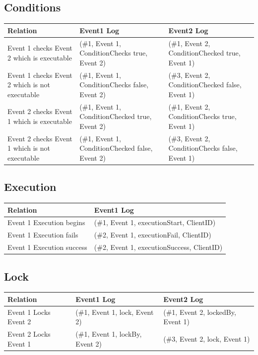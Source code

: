 \subsection{Conditions}
\begin{tabularx}{\textwidth}{|*{3}{>{\raggedright\arraybackslash}X|}}\hline
	Relation & Event1 Log & Event2 Log \\\hline
	Event 1 checks Event 2 which is executable & (\#1, Event 1, ConditionChecks true, Event 2) & (\#1, Event 2, ConditionChecked true, Event 1) \\\hline
	Event 1 checks Event 2 which is not executable & (\#1, Event 1, ConditionChecks false, Event 2) & (\#3, Event 2, ConditionChecked false, Event 1) \\\hline
	Event 2 checks Event 1 which is executable & (\#1, Event 1, ConditionChecked true, Event 2) & (\#1, Event 2, ConditionChecks true, Event 1) \\\hline
	Event 2 checks Event 1 which is not executable & (\#1, Event 1, ConditionChecked false, Event 2) & (\#3, Event 2, ConditionChecks false, Event 1) \\\hline
\end{tabularx}

\subsection{Execution}
\begin{tabularx}{\textwidth}{ | X | X | }
  \hline
  Relation & Event1 Log \\
  \hline
  Event 1 Execution begins & (\#1, Event 1, executionStart, ClientID) \\
  \hline
  Event 1 Execution fails & (\#2, Event 1, executionFail, ClientID) \\
  \hline
  Event 1 Execution success & (\#2, Event 1, executionSuccess, ClientID) \\
  \hline
\end{tabularx}

\subsection{Lock}
\begin{tabularx}{\textwidth}{|*{3}{>{\raggedright\arraybackslash}X|}}
  \hline
  Relation & Event1 Log & Event2 Log \\
  \hline
  Event 1 Locks Event 2 & (\#1, Event 1, lock, Event 2) & (\#1, Event 2, lockedBy, Event 1) \\
  \hline
  Event 2 Locks Event 1 & (\#1, Event 1, lockBy, Event 2) & (\#3, Event 2, lock, Event 1) \\
  \hline
\end{tabularx}

